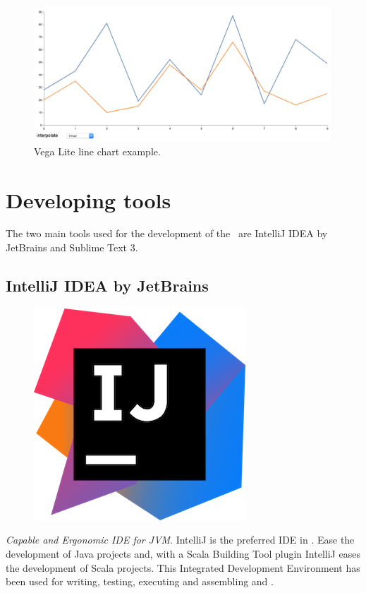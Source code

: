 \begin{figure}[H]
\centering
\includegraphics[scale=0.4]{resources/lineal-chart-example01.png}
\caption{Vega Lite line chart example.}
\end{figure}

\section{Developing tools}

The two main tools used for the development of the \thesis\ are IntelliJ IDEA by JetBrains and Sublime Text 3.

\subsection*{IntelliJ IDEA by JetBrains\cite{intellij}}

\begin{figure}[H]
\includegraphics[scale=0.1]{resources/intellij-logo.png}
\end{figure}

\textit{Capable and Ergonomic IDE for JVM}. IntelliJ is the preferred IDE\cite{ide} in \company. Ease the development of Java projects and, with a Scala Building Tool plugin IntelliJ eases the development of Scala projects. This Integrated Development Environment has been used for writing, testing, executing and assembling  and .

